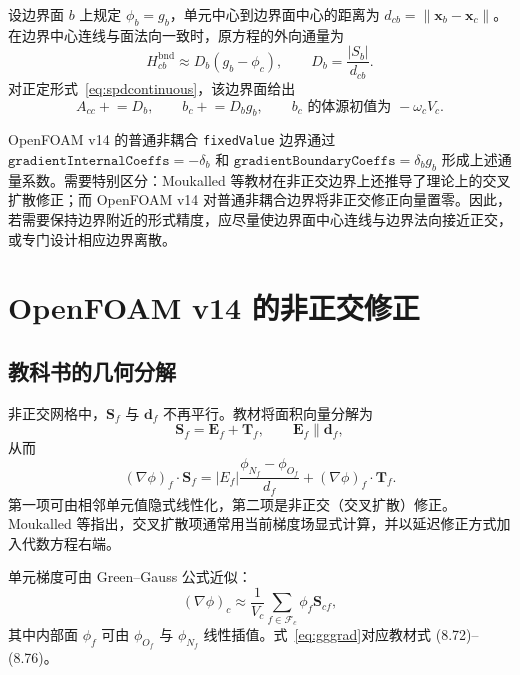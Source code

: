 \documentclass[UTF8,a4paper,11pt]{ctexart}
\newcommand{\vect}[1]{\bm{#1}}
\newcommand{\Sf}{\vect S_f}
\newcommand{\Scf}{\vect S_{cf}}
\newcommand{\df}{\vect d_f}
\begin{document}
设边界面 \(b\) 上规定
\(\phi_b=g_b\)，单元中心到边界面中心的距离为
\(d_{cb}=\lVert\vect x_b-\vect x_c\rVert\)。在边界中心连线与面法向一致时，原方程的外向通量为
\begin{equation}
  H_{cb}^{\mathrm{bnd}}
  \approx D_b(g_b-\phi_c),
  \qquad D_b=\frac{|S_b|}{d_{cb}}.
  \label{eq:dirflux}
\end{equation}
对正定形式~\eqref{eq:spdcontinuous}，该边界面给出
\begin{equation}
  A_{cc}\mathrel{+}=D_b,
  \qquad
  b_c\mathrel{+}=D_bg_b,
  \qquad
  b_c\text{ 的体源初值为 }-\omega_cV_c.
  \label{eq:dirassembly}
\end{equation}

OpenFOAM v14 的普通非耦合 \texttt{fixedValue} 边界通过
\(\texttt{gradientInternalCoeffs}=-\delta_b\) 和
\(\texttt{gradientBoundaryCoeffs}=\delta_bg_b\)
形成上述通量系数\cite{OFfixedValue}。需要特别区分：Moukalled 等教材在非正交边界上还推导了理论上的交叉扩散修正\cite[式 (8.81)--(8.83)]{Moukalled2016}；而 OpenFOAM v14 对普通非耦合边界将非正交修正向量置零\cite{OFsurface}。因此，若需要保持边界附近的形式精度，应尽量使边界面中心连线与边界法向接近正交，或专门设计相应边界离散。

\section{OpenFOAM v14 的非正交修正}

\subsection{教科书的几何分解}

非正交网格中，\(\Sf\) 与 \(\df\) 不再平行。教材将面积向量分解为
\begin{equation}
  \Sf=\vect E_f+\vect T_f,
  \qquad \vect E_f\parallel\df,
  \label{eq:decompose}
\end{equation}
从而
\begin{equation}
  (\nabla\phi)_f\cdot\Sf
  =|E_f|\frac{\phi_{N_f}-\phi_{O_f}}{d_f}
   +(\nabla\phi)_f\cdot\vect T_f .
  \label{eq:crossdiff}
\end{equation}
第一项可由相邻单元值隐式线性化，第二项是非正交（交叉扩散）修正。Moukalled 等\cite[式 (8.66)--(8.71)，第 8.6.5 节]{Moukalled2016}指出，交叉扩散项通常用当前梯度场显式计算，并以延迟修正方式加入代数方程右端。

单元梯度可由 Green--Gauss 公式近似：
\begin{equation}
  (\nabla\phi)_c
  \approx\frac{1}{V_c}
  \sum_{f\in\mathcal F_c}\phi_f\Scf,
  \label{eq:gggrad}
\end{equation}
其中内部面 \(\phi_f\) 可由 \(\phi_{O_f}\) 与 \(\phi_{N_f}\) 线性插值。式~\eqref{eq:gggrad}对应教材式 (8.72)--(8.76)\cite{Moukalled2016}。
\end{document}
